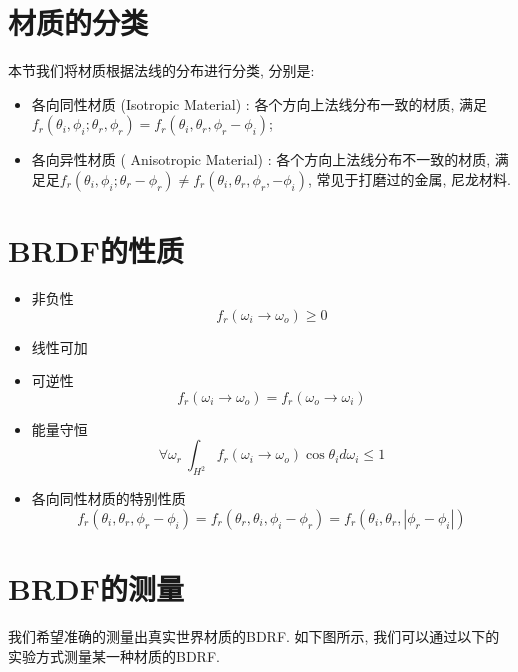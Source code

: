 \documentclass[openany]{progbookcn}
\begin{document}
\section{材质的分类}

本节我们将材质根据法线的分布进行分类, 分别是: 
\begin{itemize}
	\item 各向同性材质 (Isotropic Material) : 各个方向上法线分布一致的材质, 满足$f_r(\theta_i,\phi_i;\theta_r,\phi_r)=f_r(\theta_i,\theta_r,\phi_r-\phi_i)$; 
	\item 各向异性材质 ( Anisotropic Material) : 各个方向上法线分布不一致的材质, 满足足$f_r(\theta_i,\phi_i;\theta_r-\phi_r)\neq f_r(\theta_i,\theta_r,\phi_r,-\phi_i)$, 常见于打磨过的金属, 尼龙材料. 
\end{itemize}

\section{BRDF的性质}
\begin{itemize}
	\item 非负性
	\begin{equation}
		f_r(\omega_i\rightarrow \omega_o) \geq 0
	\end{equation}
	\item 线性可加
	\item 可逆性
	\begin{equation}
		f_r(\omega_i\rightarrow \omega_o)=f_r(\omega_o\rightarrow \omega_i)
	\end{equation}
	\item 能量守恒
	\begin{equation}
		\forall\omega_r\ \int_{H^2}f_r(\omega_i\rightarrow \omega_o)\cos\theta_id\omega_i\leq 1
	\end{equation}
	\item 各向同性材质的特别性质
	\begin{equation}
		f_r(\theta_i,\theta_r,\phi_r-\phi_i)=f_r(\theta_r,\theta_i,\phi_i-\phi_r)=f_r(\theta_i,\theta_r,|\phi_r-\phi_i|)
	\end{equation}
\end{itemize}

\section{BRDF的测量}

我们希望准确的测量出真实世界材质的BDRF. 如下图所示, 我们可以通过以下的实验方式测量某一种材质的BDRF. 
\end{document}
